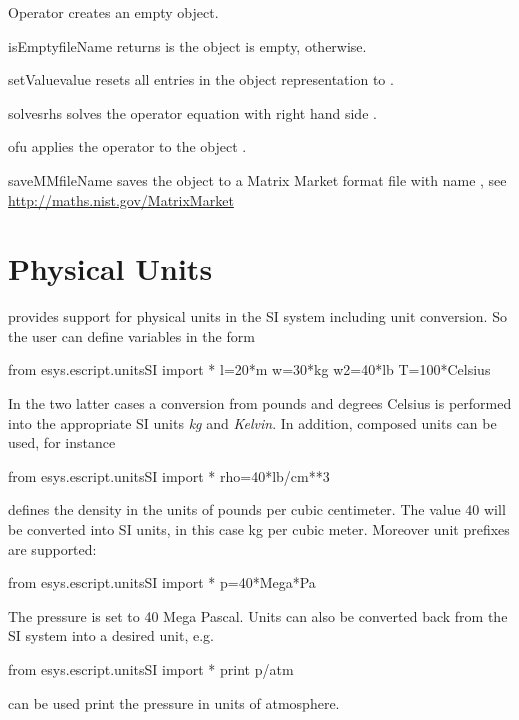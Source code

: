 \begin{classdesc}{Operator}{}
creates an empty \Operator object.
\end{classdesc}

\begin{methoddesc}[Operator]{isEmpty}{fileName}
returns \True is the object is empty, \False otherwise.
\end{methoddesc}

\begin{methoddesc}[Operator]{setValue}{value}
resets all entries in the object representation to .
\end{methoddesc}

\begin{methoddesc}[Operator]{solves}{rhs}
solves the operator equation with right hand side .
\end{methoddesc}

\begin{methoddesc}[Operator]{of}{u}
applies the operator to the \Data object .
\end{methoddesc}

\begin{methoddesc}[Operator]{saveMM}{fileName}
saves the object to a Matrix Market format file with name , see
\url{http://maths.nist.gov/MatrixMarket}
\end{methoddesc}

\section{Physical Units}
\escript provides support for physical units in the SI system
including unit conversion. So the user can define variables in the form
\begin{python}
  from esys.escript.unitsSI import *
  l=20*m
  w=30*kg
  w2=40*lb
  T=100*Celsius
\end{python}
In the two latter cases a conversion from pounds and degrees
Celsius is performed into the appropriate SI units \emph{kg}
and \emph{Kelvin}.
In addition, composed units can be used, for instance
\begin{python}
  from esys.escript.unitsSI import *
  rho=40*lb/cm**3
\end{python}
defines the density in the units of pounds per cubic centimeter.
The value $40$ will be converted into SI units, in this case kg per cubic
meter. Moreover unit prefixes are supported:
\begin{python}
  from esys.escript.unitsSI import *
  p=40*Mega*Pa
\end{python}
The pressure  is set to 40 Mega Pascal. Units can also be converted
back from the SI system into a desired unit, e.g.
\begin{python}
  from esys.escript.unitsSI import *
  print p/atm
\end{python}
can be used print the pressure in units of atmosphere.

